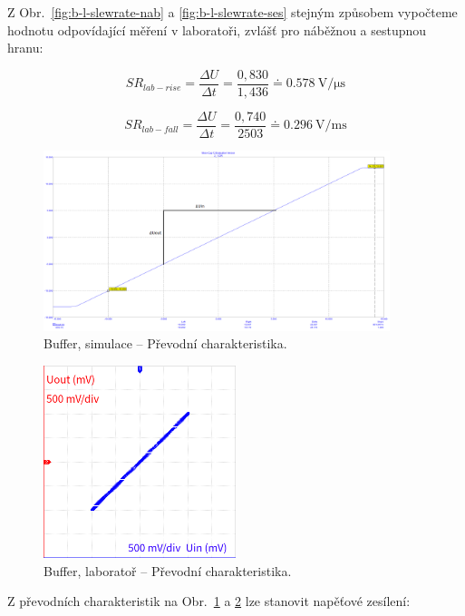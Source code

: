 \documentclass{protokol}
\begin{document}
	Z Obr.~\ref{fig:b-l-slewrate-nab} a \ref{fig:b-l-slewrate-ses} stejným způsobem vypočteme hodnotu odpovídající měření v laboratoři, zvlášť pro náběžnou a sestupnou hranu:

$$ SR_{lab - rise}=\frac{\Delta U}{\Delta t}=\frac{0,830}{1,436}\doteq \qty{0.578}{\volt\per\micro\second} $$

$$ SR_{lab - fall}=\frac{\Delta U}{\Delta t}=\frac{0,740}{2503}\doteq \qty{0.296}{\volt\per\milli\second} $$

	

	\begin{figure}[h!]
		\centering
		\includegraphics[width=0.9\textwidth]{numerika/Buffer/6_dc_zesileni_a_saturacni.png}
		\centering
		\caption{Buffer, simulace -- Převodní charakteristika.}
		\label{fig:b-s-prevodni}
	\end{figure}

	\begin{figure}[h!]
		\centering
		\includegraphics[width=0.5\textwidth]{oscilo/output4.png}
		\centering
		\caption{Buffer, laboratoř -- Převodní charakteristika.}
		\label{fig:b-l-prevodni}
	\end{figure}

Z převodních charakteristik na Obr.~\ref{fig:b-s-prevodni} a \ref{fig:b-l-prevodni} lze stanovit napěťové zesílení:
\end{document}

